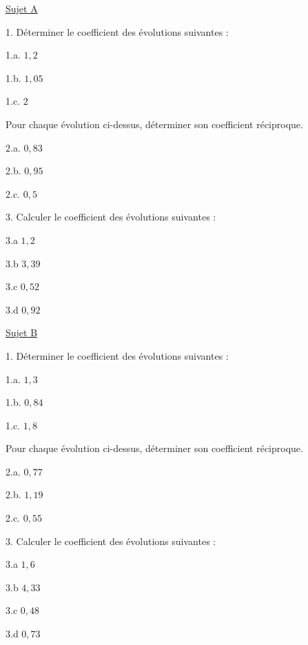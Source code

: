 \documentclass{beamer}
\begin{document}
\small

\begin{frame}
	\setlength{\columnseprule}{0.7pt}
	\begin{multicols}{2}
		\uline{Sujet A}\vspace{1em}

		{\color{blue} 1.} Déterminer le coefficient des évolutions suivantes :\vspace{0.5em}

		{\color{blue} 1.a.} $1,2$

		{\color{blue} 1.b.} $1,05$

		{\color{blue} 1.c.} $2$

		 Pour chaque évolution ci-dessus, déterminer son coefficient réciproque.\vspace{0.5em}

		{\color{blue} 2.a.} $0,83$

		{\color{blue} 2.b.} $0,95$

		{\color{blue} 2.c.} $0,5$

		{\color{blue} 3.} Calculer le coefficient des évolutions suivantes :

		{\color{blue} 3.a} $1,2$

		{\color{blue} 3.b} $3,39$

		{\color{blue} 3.c} $0,52$

		{\color{blue} 3.d} $0,92$

		\columnbreak

		\uline{Sujet B}\vspace{1em}

		{\color{blue} 1.} Déterminer le coefficient des évolutions suivantes :\vspace{0.5em}

		{\color{blue} 1.a.} $1,3$

		{\color{blue} 1.b.} $0,84$

		{\color{blue} 1.c.} $1,8$

		 Pour chaque évolution ci-dessus, déterminer son coefficient réciproque.\vspace{0.5em}

		{\color{blue} 2.a.} $0,77$

		{\color{blue} 2.b.} $1,19$

		{\color{blue} 2.c.} $0,55$

		{\color{blue} 3.} Calculer le coefficient des évolutions suivantes :

		{\color{blue} 3.a} $1,6$

		{\color{blue} 3.b} $4,33$

		{\color{blue} 3.c} $0,48$

		{\color{blue} 3.d} $0,73$
	\end{multicols}
\end{frame}
\end{document}
